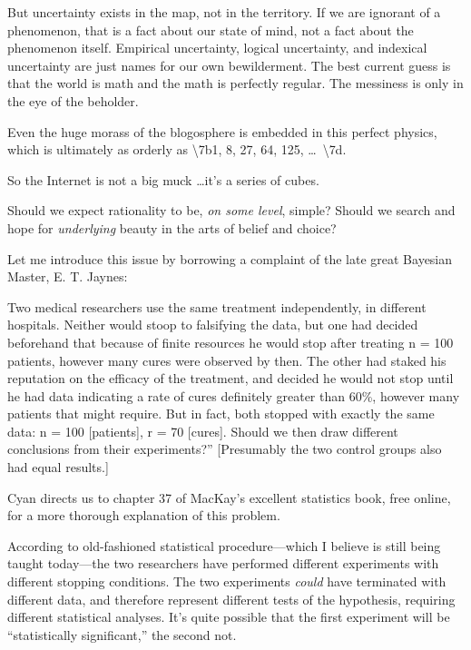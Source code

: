 {
 But uncertainty exists in the map, not in the territory. If we are
ignorant of a phenomenon, that is a fact about our state of mind, not a
fact about the phenomenon itself. Empirical uncertainty, logical
uncertainty, and indexical uncertainty are just names for our own
bewilderment. The best current guess is that the world is math and the
math is perfectly regular. The messiness is only in the eye of the
beholder.}

{
 Even the huge morass of the blogosphere is embedded in this
perfect physics, which is ultimately as orderly as
{\textbackslash}{\textquotesingle}7b1, 8, 27, 64, 125,
\ldots~{\textbackslash}{\textquotesingle}7d.}

{
 So the Internet is not a big muck \ldots it's a
series of cubes.}

\myendsectiontext


{
 Should we expect rationality to be, \textit{on some level},
simple? Should we search and hope for \textit{underlying} beauty in the
arts of belief and choice? }

{
 Let me introduce this issue by borrowing a complaint of the late
great Bayesian Master, E. T. Jaynes:}

{
 Two medical researchers use the same treatment independently, in
different hospitals. Neither would stoop to falsifying the data, but
one had decided beforehand that because of finite resources he would
stop after treating n = 100 patients, however many cures were observed
by then. The other had staked his reputation on the efficacy of the
treatment, and decided he would not stop until he had data indicating a
rate of cures definitely greater than 60\%, however many patients that
might require. But in fact, both stopped with exactly the same data: n
= 100 [patients], r = 70 [cures]. Should we then draw different
conclusions from their experiments?'' [Presumably the
two control groups also had equal results.]}

{
 Cyan directs us to chapter 37 of MacKay's
excellent statistics book, free online, for a more thorough explanation
of this problem.}

{
 According to old-fashioned statistical procedure---which I believe
is still being taught today---the two researchers have performed
different experiments with different stopping conditions. The two
experiments \textit{could} have terminated with different data, and
therefore represent different tests of the hypothesis, requiring
different statistical analyses. It's quite possible
that the first experiment will be ``statistically
significant,'' the second not.}


